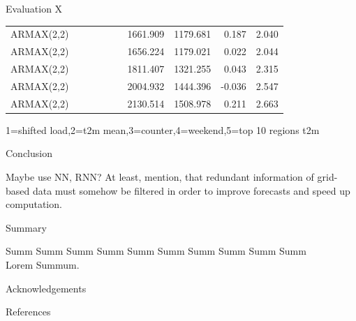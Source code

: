 \documentclass[t,xcolor={table},fleqn]{beamer}
\newcommand{\cmark}{\color{darkgreen}\ding{51}}%
\newcommand{\xmark}{\color{darkred}\ding{55}}%
\begin{document}
\begin{frame}{Evaluation X}
\begin{table}[!ht]
\begin{tabularx}{\linewidth}{Xlllllrrrr}
ARMAX(2,2) & \xmark & \cmark & \xmark & \cmark & \xmark & 1661.909 & 1179.681 & 0.187 & 2.040\\
ARMAX(2,2) & \xmark & \cmark & \cmark & \cmark & \xmark & 1656.224 & 1179.021 & 0.022 & 2.044\\
ARMAX(2,2) & \xmark & \cmark & \cmark & \cmark & \cmark & 1811.407 & 1321.255 & 0.043 & 2.315\\
ARMAX(2,2) & \xmark & \xmark & \cmark & \xmark & \cmark & 2004.932 & 1444.396 & -0.036 & 2.547\\
ARMAX(2,2) & \xmark & \xmark & \xmark & \xmark & \cmark & 2130.514 & 1508.978 & 0.211 & 2.663\\
\end{tabularx}
\end{table}

1=shifted load,2=t2m mean,3=counter,4=weekend,5=top 10 regions t2m

\end{frame}




\begin{frame}{Conclusion}

Maybe use NN, RNN? At least, mention, that redundant information of grid-based data must somehow be filtered in order to improve forecasts and speed up computation.\\
\vspace{5mm}

\end{frame}

\begin{frame}{Summary}

Summ Summ Summ Summ Summ Summ Summ Summ Summ Summ\\
Lorem Summum.

\end{frame}

\begin{frame}
\vspace{26mm}\hspace{20mm}
{\Huge Acknowledgements}\\
\end{frame}


\begin{frame}[allowframebreaks]{References}
\printbibliography[heading=none]
\end{frame}
\end{document}
